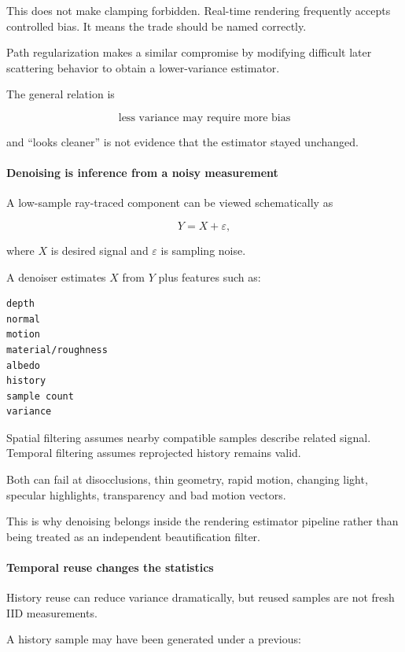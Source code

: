 This does not make clamping forbidden. Real-time rendering frequently accepts controlled bias. It means the trade should be named correctly.

Path regularization makes a similar compromise by modifying difficult later scattering behavior to obtain a lower-variance estimator.

The general relation is

\[
\boxed{
\text{less variance may require more bias}
}
\]

and ``looks cleaner'' is not evidence that the estimator stayed unchanged.

\paragraph{Denoising is inference from a noisy measurement}\label{denoising-is-inference-from-a-noisy-measurement}

A low-sample ray-traced component can be viewed schematically as

\[
Y=X+\varepsilon,
\]

where \(X\) is desired signal and \(\varepsilon\) is sampling noise.

A denoiser estimates \(X\) from \(Y\) plus features such as:

\begin{verbatim}
depth
normal
motion
material/roughness
albedo
history
sample count
variance
\end{verbatim}

Spatial filtering assumes nearby compatible samples describe related signal. Temporal filtering assumes reprojected history remains valid.

Both can fail at disocclusions, thin geometry, rapid motion, changing light, specular highlights, transparency and bad motion vectors.

This is why denoising belongs inside the rendering estimator pipeline rather than being treated as an independent beautification filter.

\paragraph{Temporal reuse changes the statistics}\label{temporal-reuse-changes-the-statistics}

History reuse can reduce variance dramatically, but reused samples are not fresh IID measurements.

A history sample may have been generated under a previous:

